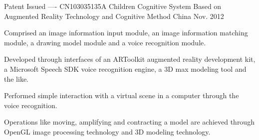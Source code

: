 


\begin{cventries}


\cventry
{Patent Issued ---- CN103035135A} %
{Children Cognitive System Based on Augmented Reality Technology and Cognitive Method} %
{China} %
{Nov. 2012} %
{ %
\begin{cvitems}
\item {Comprised an image information input module, an image information matching module, a drawing model module and a voice recognition module.}
\item {Developed through interfaces of an ARToolkit augmented reality development kit, a Microsoft Speech SDK voice recognition engine, a 3D max modeling tool and the like.}
\item {Performed simple interaction with a virtual scene in a computer through the voice recognition.}
\item {Operations like moving, amplifying and contracting a model are achieved through OpenGL image processing technology and 3D modeling technology.}
\end{cvitems}
}


\end{cventries}
